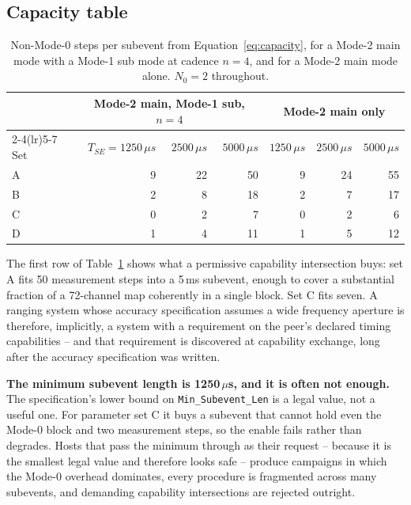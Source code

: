 \documentclass[11pt,a4paper]{article}
\newcommand{\us}{\,\ensuremath{\upmu}s}
\newcommand{\code}[1]{\texttt{\small #1}}
\newcommand{\Tse}{T_{SE}}
\providecommand{\upmu}{\mu}
\begin{document}
\subsection{Capacity table}

\begin{table}[htb]
\caption{Non-Mode-0 steps per subevent from Equation~\eqref{eq:capacity}, for a Mode-2 main mode with
a Mode-1 sub mode at cadence $n=4$, and for a Mode-2 main mode alone. $N_0 = 2$ throughout.}
\label{tab:capacitytable}
\centering\small
\begin{tabular}{@{}lrrrrrr@{}}
\toprule
 & \multicolumn{3}{c}{Mode-2 main, Mode-1 sub, $n=4$} & \multicolumn{3}{c}{Mode-2 main only} \\
\cmidrule(lr){2-4}\cmidrule(lr){5-7}
Set & $\Tse = 1250\us$ & $2500\us$ & $5000\us$ & $1250\us$ & $2500\us$ & $5000\us$ \\
\midrule
A & 9 & 22 & 50 & 9 & 24 & 55 \\
B & 2 & 8  & 18 & 2 & 7  & 17 \\
C & 0 & 2  & 7  & 0 & 2  & 6  \\
D & 1 & 4  & 11 & 1 & 5  & 12 \\
\bottomrule
\end{tabular}
\end{table}

The first row of Table~\ref{tab:capacitytable} shows what a permissive capability intersection buys:
set A fits 50 measurement steps into a 5\,ms subevent, enough to cover a substantial fraction of a
72-channel map coherently in a single block. Set C fits seven. A ranging system whose accuracy specification
assumes a wide frequency aperture is therefore, implicitly, a system with a requirement on the peer's
declared timing capabilities -- and that requirement is discovered at capability exchange, long after
the accuracy specification was written.

\begin{callout}
\textbf{The minimum subevent length is 1250\us, and it is often not enough.} The specification's
lower bound on \code{Min\_Subevent\_Len} is a legal value, not a useful one. For parameter set C it
buys a subevent that cannot hold even the Mode-0 block and two measurement steps, so the enable
fails rather than degrades. Hosts that pass the minimum through as their request -- because it is the
smallest legal value and therefore looks safe -- produce campaigns in which the Mode-0 overhead
dominates, every procedure is fragmented across many subevents, and demanding capability
intersections are rejected outright.
\end{callout}
\end{document}
